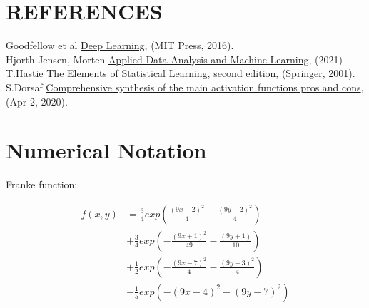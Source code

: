 \documentclass[english,notitlepage,reprint,nofootinbib]{revtex4-1}  %
\begin{document}
\section{REFERENCES}\label{sec:REF}
Goodfellow et al \href{https://www.deeplearningbook.org/}{Deep Learning}, (MIT Press, 2016).\label{ref:Goodfellow et al}
\\
Hjorth-Jensen, Morten \href{https://compphysics.github.io/MachineLearning/doc/LectureNotes/_build/html/intro.html}{Applied Data Analysis and Machine Learning}, (2021) \label{ref:Morten}
\\
T.Hastie \href{https://hastie.su.domains/Papers/ESLII.pdf}{The Elements of Statistical Learning}, second edition, (Springer, 2001).\label{ref:HASTIE}
\\
S.Dorsaf \href{https://medium.com/analytics-vidhya/comprehensive-synthesis-of-the-main-activation-functions-pros-and-cons-dab105fe4b3b}{Comprehensive synthesis of the main activation functions pros and cons}, (Apr 2, 2020).\label{ref:DORSAF}




\appendix

\section{Numerical Notation}\label{sec:NOTATION}
\caption{Franke function:}
\label{eq:FrankeFunction}
\begin{align*}
    f(x,y) &= \frac{3}{4} exp \left( \frac{(9x -2)^2}{4} - \frac{(9y -2)^2}{4}  \right) \\
    &+  \frac{3}{4} exp \left( -\frac{(9x + 1)^2}{49} - \frac{(9y + 1)}{10} \right) \\
    &+ \frac{1}{2} exp \left( -\frac{(9x -7)^2}{4} - \frac{(9y - 3)^2}{4} \right) \\
    &- \frac{1}{5} exp \left( - (9x - 4)^2 - (9y - 7)^2 \right)
\end{align*}
\end{document}
